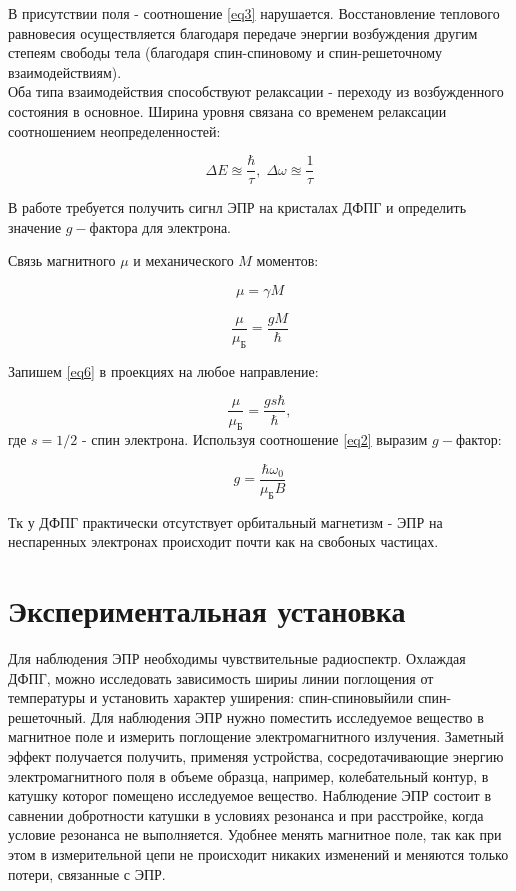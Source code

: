 \documentclass[a4paper]{article}
\begin{document}
В присутствии поля - соотношение \ref{eq3} нарушается. Восстановление теплового равновесия осуществляется благодаря передаче энергии возбуждения другим степеям свободы тела (благодаря спин-спиновому и спин-решеточному взаимодействиям). \\
Оба типа взаимодействия способствуют релаксации - переходу из возбужденного состояния в основное. Ширина уровня связана со временем релаксации соотношением неопределенностей:

\begin{equation}
    \varDelta E \approxeq \frac{\hbar}{\tau}, \; \varDelta \omega \approxeq \frac{1}{\tau} \label{eq4}
\end{equation}

В работе требуется получить сигнл ЭПР на кристалах ДФПГ и определить значение $g-$фактора для электрона. 

Связь магнитного $\mu$ и механического $M$ моментов:

\begin{equation}
    \mu = \gamma M \label{eq5}
\end{equation}

\begin{equation}
    \frac{\mu}{\mu_Б} = \frac{gM}{\hbar} \label{eq6} 
\end{equation}

Запишем \ref{eq6} в проекциях на любое направление:

\begin{equation}
    \frac{\mu}{\mu_Б} = \frac{gs\hbar}{\hbar}, \label{eq7} 
\end{equation}
 где $s=1/2$ - спин электрона. Используя соотношение \ref{eq2} выразим $g-$фактор:

\begin{equation}
    g = \frac{\hbar \omega_0}{\mu_Б B} \label{eq8}
\end{equation}

Тк у ДФПГ практически отсутствует орбитальный магнетизм - ЭПР на неспаренных электронах происходит почти как на свобоных частицах.

\section{Экспериментальная установка}

Для наблюдения ЭПР необходимы чувствительные радиоспектр. Охлаждая ДФПГ, можно исследовать зависимость шириы линии поглощения от температуры и установить характер уширения: спин-спиновыйили спин-решеточный. Для наблюдения ЭПР нужно поместить исследуемое вещество в магнитное поле и измерить поглощение электромагнитного излучения. Заметный эффект получается получить, применяя устройства, сосредотачивающие энергию электромагнитного поля в объеме образца, например, колебательный контур, в катушку которог помещено исследуемое вещество. Наблюдение ЭПР состоит в савнении добротности катушки в условиях резонанса и при расстройке, когда условие резонанса не выполняется. Удобнее менять магнитное поле, так как при этом в измерительной цепи не происходит никаких изменений и меняются только потери, связанные с ЭПР. 
\end{document}
